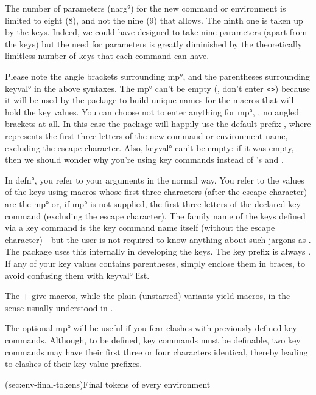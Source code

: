 \documentclass[
  use-a4-paper,
  use-10pt-font,
  final-version,
  use-UK-English,
  fancy-section-headings,
  frame-section-numbers,
  input-config-file,
  no-hyperref-messages,
  fancy-footers
]{amltxdoc}
\begin{document}
\ltsnote The number of parameters (\ang{narg}) for the new command or environment is limited to eight (8), and not the nine (9) that \tex allows. The ninth one is taken up by the keys. Indeed, we could have designed \ffx{\newkeycmd, \renewkeycmd, \newkeyenviron, \renewkeyenviron} to take nine parameters (apart from the keys) but the need for parameters is greatly diminished by the theoretically limitless number of keys that each command can have.

Please note the angle brackets surrounding \ang{mp}, and the parentheses surrounding \ang{keyval} in the above syntaxes. The \ang{mp} can't be empty (\ie, don't  enter \texttt{<>}) because it will be used by the package to build unique names for the macros that will hold the key values. You can choose not to enter anything for \ang{mp}, \ie, no angled brackets at all. In this case the package will happily use the default prefix , where  represents the first three letters of the new command or environment name, excluding the escape character. Also, \ang{keyval} can't be empty: if it was empty, then we should wonder why you're using key commands instead of \latex's \fx{\newcommand} and \fx{\newenvironment}.

In \ang{defn}, you refer to your arguments in the normal way. You refer to the values of the keys using macros whose first three characters (after the escape character) are the \ang{mp} or, if \ang{mp} is not supplied, the first three letters of the declared key command (excluding the escape character). The family name of the keys defined via a key command is the key command name itself (without the escape character)---but the user is not required to know anything about such jargons as . The package uses this internally in developing the keys. The key prefix is always . If any of your key values contains parentheses, simply enclose them in braces, to avoid confusing them with \ang{keyval} list.

The \stform+ give  macros, while the plain (unstarred) variants yield  macros, in the sense usually understood in \latex.

The optional \ang{mp} will be useful if you fear clashes with previously defined key commands. Although, to be defined, key commands must be definable, two key commands may have their first three or four characters identical, thereby leading to clashes of their key-value prefixes.


\docsubsection(sec:env-final-tokens){Final tokens of every environment}
\end{document}

